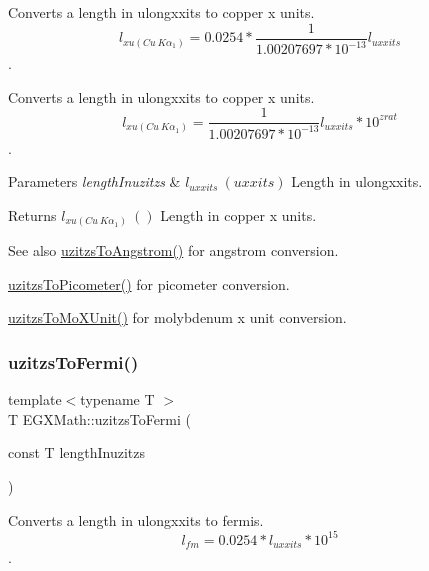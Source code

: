 Converts a length in ulongxxits to copper x units. \[ l_{xu(Cu\ K\alpha_1)}=0.0254 * \frac{1}{1.00207697*10^{-13}} l_{uxxits}\]. 

Converts a length in ulongxxits to copper x units. \[ l_{xu(Cu\ K\alpha_1)}= \frac{1}{1.00207697*10^{-13}} l_{uxxits} * 10^{zrat}\].


\begin{DoxyParams}{Parameters}
{\em length\+Inuzitzs} & $ l_{uxxits}\ (uxxits)$ Length in ulongxxits. \\
\hline
\end{DoxyParams}
\begin{DoxyReturn}{Returns}
$ l_{xu(Cu\ K\alpha_1)}\ ()$ Length in copper x units. 
\end{DoxyReturn}
\begin{DoxySeeAlso}{See also}
\mbox{\hyperlink{group___e_g_x_math-_conversions-_length_conversions-_imperial-uzitzs-_non-_s_i_gaaaecee65b1db5abcc71e18526e7073eb}{uzitzs\+To\+Angstrom()}} for angstrom conversion. 

\mbox{\hyperlink{group___e_g_x_math-_conversions-_length_conversions-_imperial-uzitzs-_s_i_ga48c60a4876ac426d1717096263648a4d}{uzitzs\+To\+Picometer()}} for picometer conversion. 

\mbox{\hyperlink{group___e_g_x_math-_conversions-_length_conversions-_imperial-uzitzs-_non-_s_i_ga64b556911b0bb06cf315aa02f5e2d379}{uzitzs\+To\+Mo\+X\+Unit()}} for molybdenum x unit conversion. 
\end{DoxySeeAlso}
\mbox{\label{group___e_g_x_math-_conversions-_length_conversions-_imperial-uzitzs-_non-_s_i_ga920cd8aae6bc9f70faa49a6a5c988040}} 
\subsubsection{\texorpdfstring{uzitzs\+To\+Fermi()}{uzitzsToFermi()}}
{\footnotesize\ttfamily template$<$typename T $>$ \\
T E\+G\+X\+Math\+::uzitzs\+To\+Fermi (\begin{DoxyParamCaption}\item[{const T}]{length\+Inuzitzs }\end{DoxyParamCaption})}



Converts a length in ulongxxits to fermis. \[ l_{fm}=0.0254 * l_{uxxits} * 10^{15} \]. 

